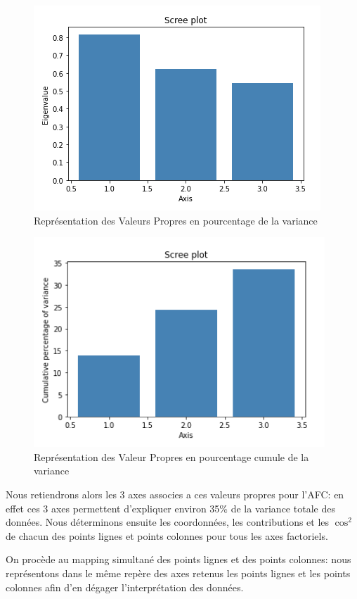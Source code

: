 \documentclass{article}
\begin{document}
\begin{figure}[h!]
\centering
\includegraphics[scale=0.75]{images/Plot_VP.PNG}
\caption{Représentation des Valeurs Propres en pourcentage de la variance}
\end{figure}

\begin{figure}[h!]
\centering
\includegraphics[scale=0.75]{images/VP_cumule.PNG}
\caption{Représentation des Valeur Propres en pourcentage cumule de la variance}
\end{figure}

Nous retiendrons alors les 3 axes associes a ces valeurs propres pour l'AFC: en effet ces 3 axes permettent d'expliquer environ 35\% de la variance totale des données. Nous déterminons ensuite les coordonnées, les contributions et les $\cos^2$ de chacun des points lignes et points colonnes pour tous les axes factoriels.
\newline

On procède au mapping simultané des points lignes et des points colonnes: nous représentons dans le même repère des axes retenus les points lignes et les points colonnes afin d'en dégager l'interprétation des données.
\end{document}
